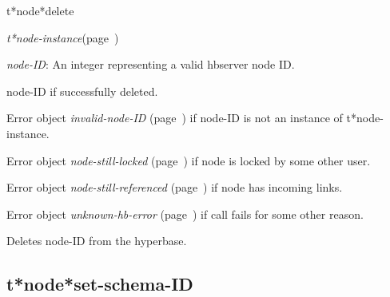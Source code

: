 \begin{description}
\item [Name:]  t*node*delete

\item [Class:] {\sl t*node-instance}\hfill(page~\pageref{t*node-instance})

\item [Parameters:]
\item {\sl node-ID}:   An integer representing
a valid hbserver node ID.


\item [Return-value:]
node-ID if successfully deleted.

Error object {\sl invalid-node-ID} (page~\pageref{invalid-node-ID}) if node-ID is 
not an instance of t*node-instance.

Error object {\sl node-still-locked} (page~\pageref{node-still-locked}) if node is locked
by some other user. 

Error object {\sl node-still-referenced} (page~\pageref{node-still-referenced}) if node
has incoming links. 

Error object {\sl unknown-hb-error} (page~\pageref{unknown-hb-error}) if call fails
for some other reason.

\item [Description:]

Deletes node-ID from the hyperbase.

\item [Public:]



\end{description}
\horizontalline

\subsection{t*node*set-schema-ID}
\label{t*node*set-schema-ID}

